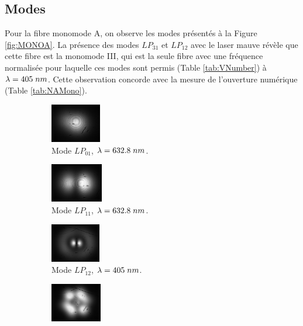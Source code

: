 \documentclass[10pt,letterpaper,twocolumn]{article}
\newcommand{\s}{\hspace{0.1cm}}
\newcommand{\na}{\text{N.A.}}
\begin{document}
\subsection{Modes}
Pour la fibre monomode A, on observe les modes présentés à la Figure \ref{fig:MONOA}. La présence des modes $LP_{31}$ et $LP_{12}$ avec le laser mauve révèle que cette fibre est la monomode III, qui est la seule fibre avec une fréquence normalisée pour laquelle ces modes sont permis (Table \ref{tab:VNumber}) à $\lambda = 405\s nm$. Cette observation concorde avec la mesure de l'ouverture numérique (Table \ref{tab:NAMono}).
\begin{figure}[H]
	\centering
	\begin{subfigure}[t]{0.3\linewidth}
		\includegraphics[height=1.7cm, width=\linewidth]{figures/mono-LP01-rouge.jpg}
		\caption{Mode $LP_{01}$, ${\lambda=632.8\s nm}$. }
		\label{fig:monoALP01}
	\end{subfigure}
	\begin{subfigure}[t]{0.3\linewidth}
		\includegraphics[height=1.7cm, width=\linewidth]{figures/monoA-LP11-rouge.jpg}
		\caption{Mode $LP_{11}$, ${\lambda=632.8\s nm}$.}
		\label{fig:monoALP11}
	\end{subfigure}
	\newline
	\begin{subfigure}[t]{0.3\linewidth}
		\includegraphics[height=1.7cm, width=\linewidth]{figures/A-LP12-mauv405.jpg}
		\caption{Mode $LP_{12}$, ${\lambda=405\s nm}$. }
		\label{fig:monoALP12}
	\end{subfigure}
	\begin{subfigure}[t]{0.3\linewidth}
		\includegraphics[height=1.7cm, width=\linewidth]{figures/A-LP21-mauve405(3).jpg}

\end{subfigure}
\end{figure}
\end{document}
